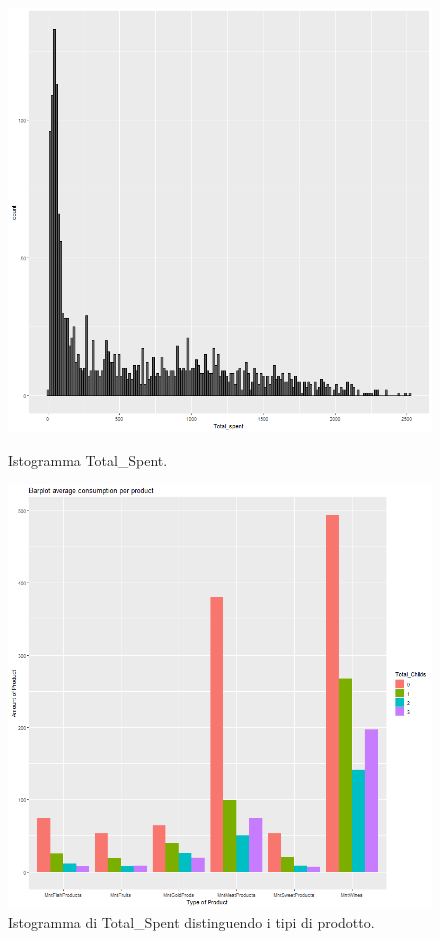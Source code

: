 \documentclass[letterpaper,11pt]{article}
\begin{document}
\begin{figure}[H]
  \centering
  \begin{minipage}[b]{0.4\textwidth}
    \includegraphics[width=\textwidth]{Img/EDA/EDA024.png}
    \caption{Istogramma Total\_Spent.}
    \label{fig:IstogrammaTs}
  \end{minipage}
  \hfill
  \begin{minipage}[b]{0.4\textwidth}
    \includegraphics[width=\textwidth]{Img/EDA/EDA023.png}
    \caption{Istogramma di Total\_Spent distinguendo i tipi di prodotto.}
    \label{fig:IstogrammaTsTypeProduct}
  \end{minipage}
\end{figure}
\end{document}
